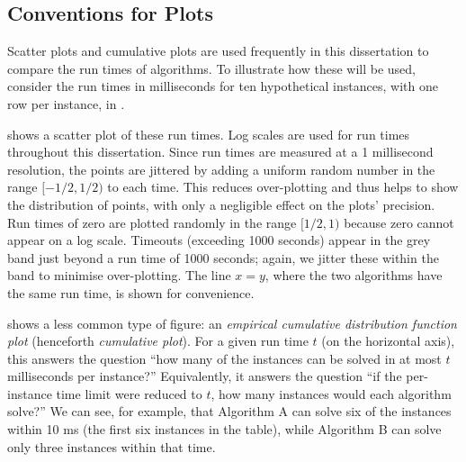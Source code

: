 \subsection{Conventions for Plots}
\label{subsec:plot-conventions}

Scatter plots and cumulative plots are used frequently in this dissertation to
compare the run times of algorithms.  To illustrate how these will be used,
consider the run times in milliseconds for ten hypothetical instances,
with one row per instance, in .

 shows a scatter plot of these run times. Log
scales are used for run times throughout this dissertation. Since run times are
measured at a 1 millisecond resolution, the points are jittered by adding a
uniform random number in the range $[-1/2,1/2)$ to each time. This reduces
over-plotting and thus helps to show the distribution of points, with only a
negligible effect on the plots' precision. Run times of zero are plotted
randomly in the
range $[1/2,1)$ because zero cannot appear on a log scale.  Timeouts (exceeding
1000 seconds) appear in the grey band just beyond a run time of 1000 seconds;
again, we jitter these within the band to minimise over-plotting. The line
$x=y$, where the two algorithms have the same run time, is shown for
convenience.

 shows a less common type of figure: an
\emph{empirical cumulative distribution function plot} (henceforth
\emph{cumulative plot}). For a given run time $t$ (on the horizontal axis),
this answers the question ``how many of the instances can be solved in at
most $t$ milliseconds per instance?'' Equivalently, it answers the question
``if the per-instance time limit were reduced to $t$, how many instances would
each algorithm solve?''
We can see, for example, that Algorithm A can solve six
of the instances within 10 ms (the first six instances in the table),
while Algorithm B can solve only three instances
within that time.


